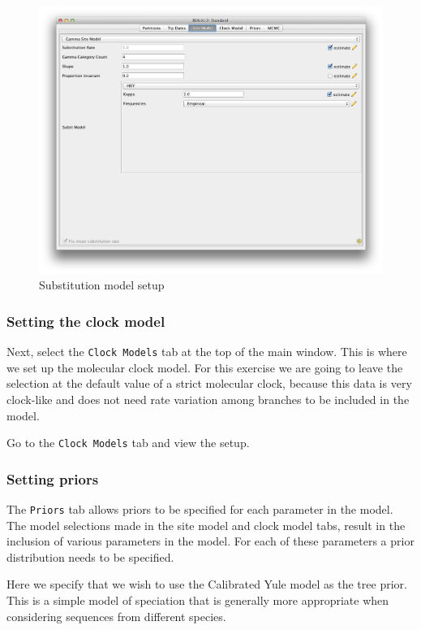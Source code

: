 \documentclass[11pt]{article}
\begin{document}
\begin{figure}[H]
\centering
\includegraphics[width=5in]{figures/substitution.png}
\caption{\small Substitution model setup}
\label{fig:subst}
\end{figure}

\subsubsection{Setting the clock model}

Next, select the \texttt{Clock Models} tab at the top of the main window. This is where we set up the molecular clock model. For this exercise we are going to leave the selection at the default value of a strict molecular clock, because this data is very clock-like and does not need rate variation among branches to be included in the model.

\begin{framed}
Go to the \texttt{Clock Models} tab and view the setup.
\end{framed}

\subsubsection{Setting priors}

The \texttt{Priors} tab allows priors to be specified for each parameter in the model. The model selections made in the site model and clock model tabs, result in the inclusion of various parameters in the model. For each of these parameters a prior distribution needs to be specified.

Here we specify that we wish to use the Calibrated Yule model as the tree prior. This is a simple model of speciation that is generally more appropriate when considering sequences from different species.
\end{document}
